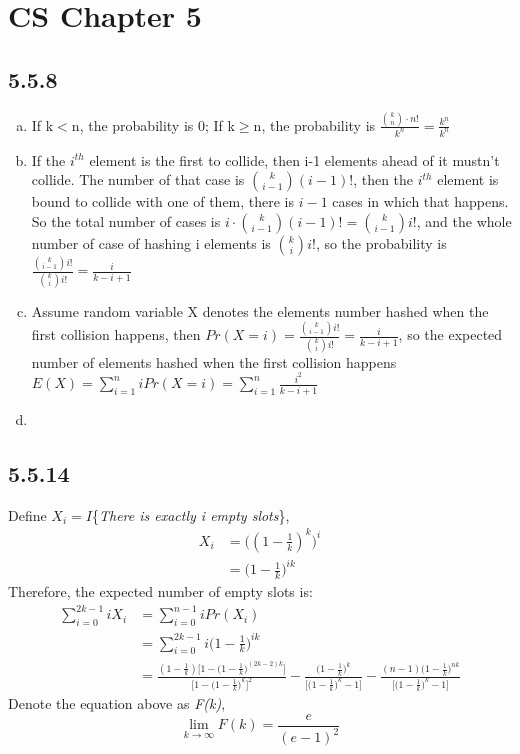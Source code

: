 \documentclass{article}
\begin{document}
\normalsize
\section*{CS Chapter 5} 
\subsection*{5.5.8}
\begin{enumerate}[a.]
	\item If k$<$n, the probability is 0; If k$\geq$n, the probability is $\frac{\binom{k}{n}\cdot n!}{k^n} = \frac{k^{\underline n}}{k^n}$
	\item If the $i^{th}$ element is the first to collide, then i-1 elements ahead of it mustn't collide. The number of that case is $\binom{k}{i-1}(i-1)!$, then the $i^{th}$ element is bound to collide with one of them, there is $i-1$ cases in which that happens. So the total number of cases is $i\cdot \binom{k}{i-1}(i-1)!=\binom{k}{i-1}i!$, and the whole number of case of hashing i elements is $\binom{k}{i}i!$, so the probability is $\frac{\binom{k}{i-1}i!}{\binom{k}{i}i!}=\frac{i}{k-i+1}$
	\item Assume random variable X denotes the elements number hashed when the first collision happens, then $Pr(X=i)=\frac{\binom{k}{i-1}i!}{\binom{k}{i}i!}=\frac{i}{k-i+1}$, so the expected number of elements hashed when the first collision happens $E(X)=\sum_{i=1}^{n}iPr(X=i)=\sum_{i=1}^{n}\frac{i^2}{k-i+1}$
	\item 
\end{enumerate}
\subsection*{5.5.14}
Define $X_i=I$\{\emph{There is exactly i empty slots}\},
\begin{equation*}
\begin{aligned}
X_i&=\big((1-\frac{1}{k})^k\big)^i\\
&=\big(1-\frac{1}{k}\big)^{ik}
\end{aligned}
\end{equation*}
Therefore, the expected number of empty slots is:
\begin{equation*}
\begin{aligned}
\sum_{i=0}^{2k-1}iX_i&=\sum_{i=0}^{n-1}iPr(X_i)\\
&=\sum_{i=0}^{2k-1}i\big(1-\frac{1}{k}\big)^{ik}\\
&=\frac{(1-\frac{1}{k})\big[1-\big(1-\frac{1}{k}\big)^{(2k-2)k}\big]}{\big[1-\big(1-\frac{1}{k}\big)^k\big]^2}-\frac{\big(1-\frac{1}{k}\big)^k}{\big[\big(1-\frac{1}{k}\big)^k-1\big]}-\frac{(n-1)\big(1-\frac{1}{k}\big)^{nk}}{\big[\big(1-\frac{1}{k}\big)^k-1\big]}
\end{aligned}
\end{equation*}
Denote the equation above as \emph{F(k)}, \[\lim\limits_{k\to\infty}F(k)=\frac{e}{(e-1)^2}\]
\end{document}
